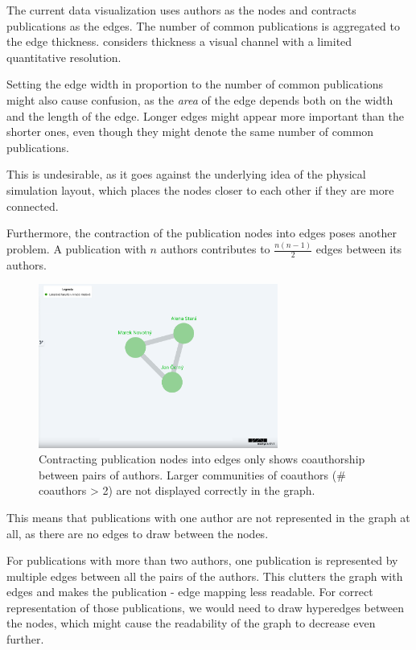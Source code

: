 The current data visualization uses authors as the nodes and contracts publications as the edges.
The number of common publications is aggregated to the edge thickness. \cite{10.5555/2385879} considers thickness a visual channel with a limited quantitative resolution.

Setting the edge width in proportion to the number of common publications might also cause confusion, as the \textit{area} of the edge depends both on the width and the length of the edge.
Longer edges might appear more important than the shorter ones, even though they might denote the same number of common publications.

This is undesirable, as it goes against the underlying idea of the physical simulation layout, which places the nodes closer to each other if they are more connected.

Furthermore, the contraction of the publication nodes into edges poses another problem.
A publication with $n$ authors contributes to $\frac{n(n-1)}{2}$ edges between its authors. 

\begin{figure}[ht!]
    \captionsetup{width=.9\linewidth}
    \includegraphics[width=0.7\textwidth]{../img/contraction.png}
    \centering
    \caption{Contracting publication nodes into edges only shows coauthorship between pairs of authors. Larger communities of coauthors (\# coauthors > 2) are not displayed correctly in the graph.}
\end{figure}

This means that publications with one author are not represented in the graph at all, as there are no edges to draw between the nodes.

For publications with more than two authors, one publication is represented by multiple edges between all the pairs of the authors.
This clutters the graph with edges and makes the publication - edge mapping less readable. 
For correct representation of those publications, we would need to draw hyperedges between the nodes, which might cause the readability of the graph to decrease even further.

